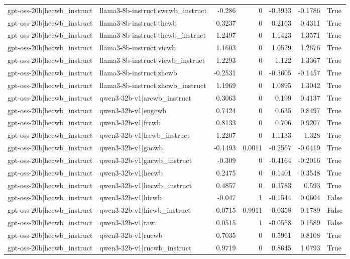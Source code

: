 \begin{table}
\begin{tabular}{l l r r r r l}
gpt-oss-20b|hecwb_instruct & llama3-8b-instruct|swcwb_instruct & -0.286 & 0 & -0.3933 & -0.1786 & True \\
gpt-oss-20b|hecwb_instruct & llama3-8b-instruct|thcwb & 0.3237 & 0 & 0.2163 & 0.4311 & True \\
gpt-oss-20b|hecwb_instruct & llama3-8b-instruct|thcwb_instruct & 1.2497 & 0 & 1.1423 & 1.3571 & True \\
gpt-oss-20b|hecwb_instruct & llama3-8b-instruct|vicwb & 1.1603 & 0 & 1.0529 & 1.2676 & True \\
gpt-oss-20b|hecwb_instruct & llama3-8b-instruct|vicwb_instruct & 1.2293 & 0 & 1.122 & 1.3367 & True \\
gpt-oss-20b|hecwb_instruct & llama3-8b-instruct|zhcwb & -0.2531 & 0 & -0.3605 & -0.1457 & True \\
gpt-oss-20b|hecwb_instruct & llama3-8b-instruct|zhcwb_instruct & 1.1969 & 0 & 1.0895 & 1.3042 & True \\
gpt-oss-20b|hecwb_instruct & qwen3-32b-v1|arcwb_instruct & 0.3063 & 0 & 0.199 & 0.4137 & True \\
gpt-oss-20b|hecwb_instruct & qwen3-32b-v1|engcwb & 0.7424 & 0 & 0.635 & 0.8497 & True \\
gpt-oss-20b|hecwb_instruct & qwen3-32b-v1|frcwb & 0.8133 & 0 & 0.706 & 0.9207 & True \\
gpt-oss-20b|hecwb_instruct & qwen3-32b-v1|frcwb_instruct & 1.2207 & 0 & 1.1133 & 1.328 & True \\
gpt-oss-20b|hecwb_instruct & qwen3-32b-v1|gacwb & -0.1493 & 0.0011 & -0.2567 & -0.0419 & True \\
gpt-oss-20b|hecwb_instruct & qwen3-32b-v1|gacwb_instruct & -0.309 & 0 & -0.4164 & -0.2016 & True \\
gpt-oss-20b|hecwb_instruct & qwen3-32b-v1|hecwb & 0.2475 & 0 & 0.1401 & 0.3548 & True \\
gpt-oss-20b|hecwb_instruct & qwen3-32b-v1|hecwb_instruct & 0.4857 & 0 & 0.3783 & 0.593 & True \\
gpt-oss-20b|hecwb_instruct & qwen3-32b-v1|hicwb & -0.047 & 1 & -0.1544 & 0.0604 & False \\
gpt-oss-20b|hecwb_instruct & qwen3-32b-v1|hicwb_instruct & 0.0715 & 0.9911 & -0.0358 & 0.1789 & False \\
gpt-oss-20b|hecwb_instruct & qwen3-32b-v1|raw & 0.0515 & 1 & -0.0558 & 0.1589 & False \\
gpt-oss-20b|hecwb_instruct & qwen3-32b-v1|rucwb & 0.7035 & 0 & 0.5961 & 0.8108 & True \\
gpt-oss-20b|hecwb_instruct & qwen3-32b-v1|rucwb_instruct & 0.9719 & 0 & 0.8645 & 1.0793 & True \\

\end{tabular}
\end{table}
